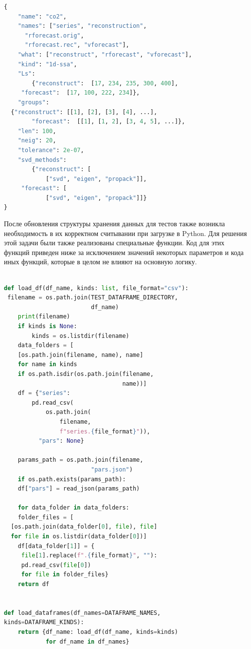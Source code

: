 \documentclass[specialist,
			   substylefile = spbu_report.rtx,
			   subf,href,colorlinks=true, 12pt]{disser}
\begin{document}
\begin{lstlisting}[language=Python, caption=Содержимое файла JSON с параметрами для тестов.]
{
	"name": "co2",
	"names": ["series", "reconstruction",
	  "rforecast.orig", 
	  "rforecast.rec", "vforecast"],
	"what": ["reconstruct", "rforecast", "vforecast"],
	"kind": "1d-ssa",
	"Ls": 
	 	{"reconstruct":  [17, 234, 235, 300, 400],
	 "forecast":  [17, 100, 222, 234]},
	"groups": 
  {"reconstruct": [[1], [2], [3], [4], ...],
		"forecast":  [[1], [1, 2], [3, 4, 5], ...]},
	"len": 100,
	"neig": 20,
	"tolerance": 2e-07,
	"svd_methods": 
		{"reconstruct": [
			["svd", "eigen", "propack"]],
	 "forecast": [
			["svd", "eigen", "propack"]]}
}
\end{lstlisting}

После обновления структуры хранения данных для тестов также возникла необходимость в их корректном считывании при загрузке в Python. Для решения этой задачи были также реализованы специальные функции. Код для этих функций приведен ниже за исключением значений некоторых параметров и кода иных функций, которые в целом не влияют на основную логику.

\begin{lstlisting}[language=Python, caption=Функции для загрузки данных для тестирования.]
	
def load_df(df_name, kinds: list, file_format="csv"):
 filename = os.path.join(TEST_DATAFRAME_DIRECTORY,
                         df_name)
    print(filename)
    if kinds is None:
        kinds = os.listdir(filename)
    data_folders = [
    [os.path.join(filename, name), name]
    for name in kinds
    if os.path.isdir(os.path.join(filename, 
                                  name))]
    df = {"series": 
        pd.read_csv(
            os.path.join(
                filename, 
                f"series.{file_format}")),
          "pars": None}
	
	params_path = os.path.join(filename,
                         "pars.json")
	if os.path.exists(params_path):
	df["pars"] = read_json(params_path)
	
	for data_folder in data_folders:
	folder_files = [
  [os.path.join(data_folder[0], file), file]
  for file in os.listdir(data_folder[0])]
	df[data_folder[1]] = {
     file[1].replace(f".{file_format}", ""):
     pd.read_csv(file[0])
     for file in folder_files}
    return df


def load_dataframes(df_names=DATAFRAME_NAMES, 
kinds=DATAFRAME_KINDS):
	return {df_name: load_df(df_name, kinds=kinds) 
			for df_name in df_names}
\end{lstlisting}
\end{document}
